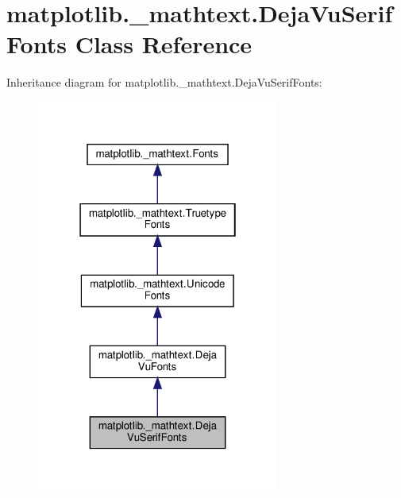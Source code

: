 \hypertarget{classmatplotlib_1_1__mathtext_1_1DejaVuSerifFonts}{}\section{matplotlib.\+\_\+mathtext.\+Deja\+Vu\+Serif\+Fonts Class Reference}
\label{classmatplotlib_1_1__mathtext_1_1DejaVuSerifFonts}


Inheritance diagram for matplotlib.\+\_\+mathtext.\+Deja\+Vu\+Serif\+Fonts\+:
\nopagebreak
\begin{figure}[H]
\begin{center}
\leavevmode
\includegraphics[width=226pt]{classmatplotlib_1_1__mathtext_1_1DejaVuSerifFonts__inherit__graph}
\end{center}
\end{figure}


